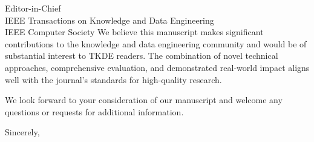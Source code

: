 \documentclass[11pt]{letter}
\begin{document}
\begin{letter}{Editor-in-Chief\\
IEEE Transactions on Knowledge and Data Engineering\\
IEEE Computer Society}
We believe this manuscript makes significant contributions to the knowledge and data engineering community and would be of substantial interest to TKDE readers. The combination of novel technical approaches, comprehensive evaluation, and demonstrated real-world impact aligns well with the journal's standards for high-quality research.

We look forward to your consideration of our manuscript and welcome any questions or requests for additional information.

\closing{Sincerely,}

\end{letter}
\end{document}
